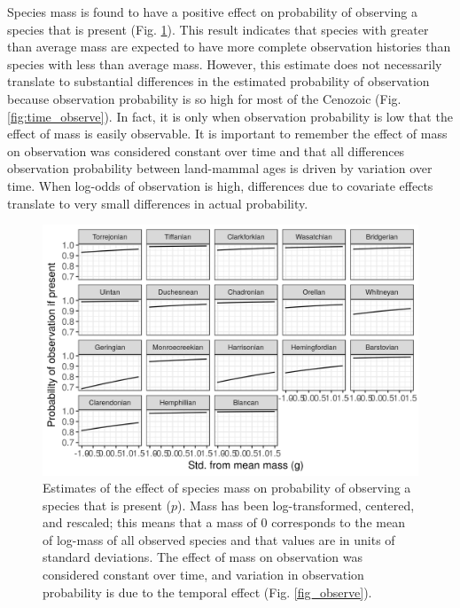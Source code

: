 \documentclass[12pt,letterpaper]{article}
\begin{document}
Species mass is found to have a positive effect on probability of observing a species that is present (Fig. \ref{fig:mass_observe}). This result indicates that species with greater than average mass are expected to have more complete observation histories than species with less than average mass. However, this estimate does not necessarily translate to substantial differences in the estimated probability of observation because observation probability is so high for most of the Cenozoic (Fig. \ref{fig:time_observe}). In fact, it is only when observation probability is low that the effect of mass is easily observable. It is important to remember the effect of mass on observation was considered constant over time and that all differences observation probability between land-mammal ages is driven by variation over time. When log-odds of observation is high, differences due to covariate effects translate to very small differences in actual probability. %
\begin{figure}[ht]
  \centering
  \includegraphics[width=\textwidth,height=0.4\textheight,keepaspectratio=true]{figure/mass_on_pres_bd}
  \caption[Estimates of the effect of mass on observation probability]{Estimates of the effect of species mass on probability of observing a species that is present (\(p\)). Mass has been log-transformed, centered, and rescaled; this means that a mass of 0 corresponds to the mean of log-mass of all observed species and that values are in units of standard deviations. The effect of mass on observation was considered constant over time, and variation in observation probability is due to the temporal effect (Fig. \ref{fig_observe}).} 
  \label{fig:mass_observe}
\end{figure}
\end{document}

